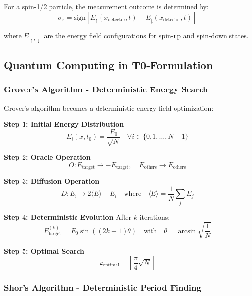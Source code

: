 \documentclass[12pt,a4paper]{article}
\theoremstyle{definition}
\begin{document}
For a spin-1/2 particle, the measurement outcome is determined by:
\begin{equation}
	\sigma_z = \text{sign}\left[E_{\uparrow}(x_{\text{detector}}, t) - E_{\downarrow}(x_{\text{detector}}, t)\right]
\end{equation}

where $E_{\uparrow,\downarrow}$ are the energy field configurations for spin-up and spin-down states.

\subsection{Quantum Computing in T0-Formulation}

\subsubsection{Grover's Algorithm - Deterministic Energy Search}

Grover's algorithm becomes a deterministic energy field optimization:

\textbf{Step 1: Initial Energy Distribution}
\begin{equation}
	E_i(x,t_0) = \frac{E_0}{\sqrt{N}} \quad \forall i \in \{0,1,\ldots,N-1\}
\end{equation}

\textbf{Step 2: Oracle Operation}
\begin{equation}
	O: E_{\text{target}} \rightarrow -E_{\text{target}}, \quad E_{\text{others}} \rightarrow E_{\text{others}}
\end{equation}

\textbf{Step 3: Diffusion Operation}
\begin{equation}
	D: E_i \rightarrow 2\langle E \rangle - E_i \quad \text{where} \quad \langle E \rangle = \frac{1}{N}\sum_j E_j
\end{equation}

\textbf{Step 4: Deterministic Evolution}
After $k$ iterations:
\begin{equation}
	E_{\text{target}}^{(k)} = E_0 \sin\left((2k+1)\theta\right) \quad \text{with} \quad \theta = \arcsin\sqrt{\frac{1}{N}}
\end{equation}

\textbf{Step 5: Optimal Search}
\begin{equation}
	k_{\text{optimal}} = \left\lfloor\frac{\pi}{4}\sqrt{N}\right\rfloor
\end{equation}

\subsubsection{Shor's Algorithm - Deterministic Period Finding}
\end{document}
